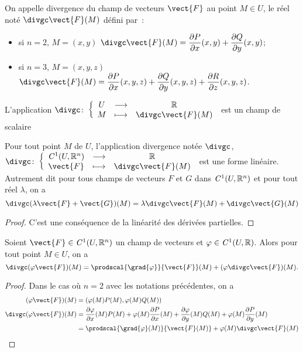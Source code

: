 \begin{defdef}
  On appelle divergence du champ de vecteurs $\vect{F}$ au point $M \in U$, le réel noté $\divgc \vect{F}(M)$ défini par~:
  \begin{itemize}
  \item si $n=2$, $M=(x,y)$ $\divgc \vect{F}(M)=\derivep{P}{x}(x,y) + \derivep{Q}{y}(x,y)$;
  \item si $n=3$, $M=(x,y,z)$ $\divgc \vect{F}(M)=\derivep{P}{x}(x,y,z) + \derivep{Q}{y}(x,y,z) + \derivep{R}{z}(x,y,z)$.
  \end{itemize}
  L'application $\fonction{\divgc}{U}{\R}{M}{\divgc \vect{F}(M)}$ est un champ de scalaire
\end{defdef}
%
\begin{prop}
  Pour tout point $M$ de $U$, l'application divergence notée $\divgc$, $\fonction{\divgc}{\classe{1}(U, \R^n)}{\R}{\vect{F}}{\divgc\vect{F}(M)}$ est une forme linéaire. Autrement dit pour tous champs de vecteurs $F$ et $G$ dans $\mathit{C}^1(U, \mathbb{R}^n)$ et pour tout réel $\lambda$, on a
  \begin{equation}
    \divgc(\lambda \vect{F} + \vect{G})(M) = \lambda \divgc \vect{F}(M) + \divgc \vect{G}(M)
  \end{equation}
\end{prop}
\begin{proof}
  C'est une conséquence de la linéarité des dérivées partielles.
\end{proof}
%
\begin{prop}
  Soient $\vect{F} \in \classe{1}(U, \R^n)$ un champ de vecteurs et $\varphi \in \mathit{C}^1(U, \mathbb{R})$. Alors pour tout point $M \in U$, on a
  \begin{equation}
    \divgc(\varphi \vect{F})(M)=\prodscal{\grad{\varphi}}{\vect{F}}(M) + (\varphi \divgc \vect{F})(M).
  \end{equation}
\end{prop}
\begin{proof}
  Dans le cas où $n=2$ avec les notations précédentes, on a
  \begin{align}
    (\varphi \vect{F})(M)& = (\varphi(M) P(M), \varphi(M) Q(M)) \\
    \divgc(\varphi \vect{F})(M)& = \derivep{\varphi}{x}(M)  P(M) + \varphi(M) \derivep{P}{x}(M) + \derivep{\varphi}{y}(M)  Q(M) + \varphi(M) \derivep{P}{y}(M) \\
    &=\prodscal{\grad{\varphi}(M)}{\vect{F}(M)} + \varphi(M)\divgc\vect{F}(M)
  \end{align}
\end{proof}

